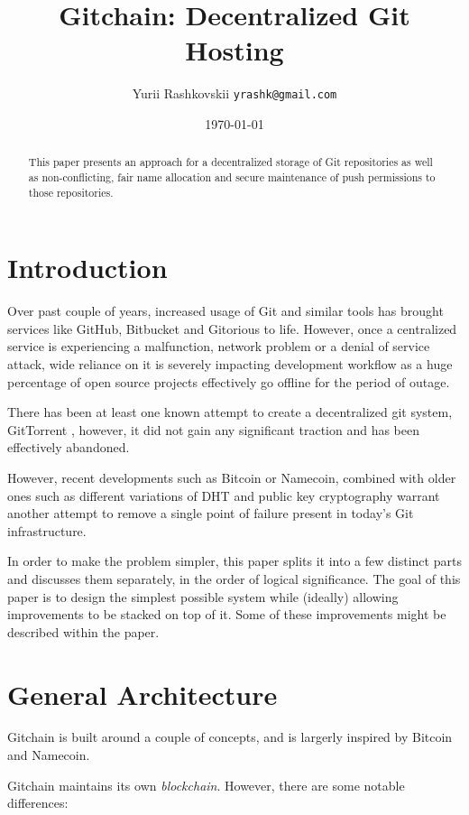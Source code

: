 \documentclass[a4paper]{article}
\title{Gitchain: Decentralized Git Hosting}
\author{Yurii Rashkovskii \texttt{yrashk@gmail.com}}
\date{\today}
\begin{document}
\maketitle

\begin{abstract}
This paper presents an approach for a decentralized storage of Git repositories as well as non-conflicting, fair name allocation and secure maintenance of push permissions to those repositories.
\end{abstract}

\section{Introduction}

Over past couple of years, increased usage of Git and similar tools has brought services like GitHub, Bitbucket and Gitorious to life. However, once a centralized service is experiencing a malfunction, network problem or a denial of service attack, wide reliance on it is severely impacting development workflow as a huge percentage of open source projects effectively go offline for the period of outage.

There has been at least one known attempt to create a decentralized git system, GitTorrent \cite{fonseca06}, however, it did not gain any significant traction and has been effectively abandoned.

However, recent developments such as Bitcoin or Namecoin, combined with older ones such as different variations of DHT and public key cryptography warrant another attempt to remove a single point of failure present in today's Git infrastructure.

In order to make the problem simpler, this paper splits it into a few distinct parts and discusses them separately, in the order of logical significance. The goal of this paper is to design the simplest possible system while (ideally) allowing improvements to be stacked on top of it. Some of these improvements might be described within the paper.

\section{General Architecture}

Gitchain is built around a couple of concepts, and is largerly inspired by Bitcoin and Namecoin.

Gitchain maintains its own \emph{blockchain}. However, there are some notable differences:
\end{document}
